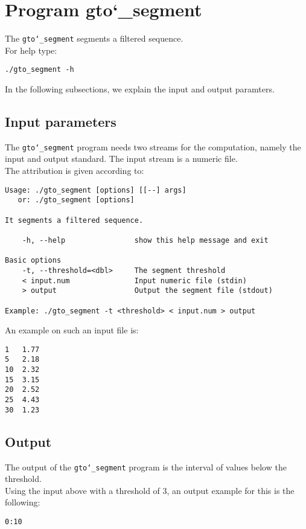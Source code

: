\section{Program gto\char`_segment}
The \texttt{gto\char`_segment} segments a filtered sequence.\\
For help type:
\begin{lstlisting}
./gto_segment -h
\end{lstlisting}
In the following subsections, we explain the input and output paramters.

\subsection*{Input parameters}

The \texttt{gto\char`_segment} program needs two streams for the computation, namely the input and output standard. The input stream is a numeric file.\\
The attribution is given according to:
\begin{lstlisting}
Usage: ./gto_segment [options] [[--] args]
   or: ./gto_segment [options]

It segments a filtered sequence.

    -h, --help                show this help message and exit

Basic options
    -t, --threshold=<dbl>     The segment threshold
    < input.num               Input numeric file (stdin)
    > output                  Output the segment file (stdout)

Example: ./gto_segment -t <threshold> < input.num > output
\end{lstlisting}
An example on such an input file is:
\begin{lstlisting}
1   1.77
5   2.18
10  2.32
15  3.15
20  2.52
25  4.43
30  1.23
\end{lstlisting}

\subsection*{Output}
The output of the \texttt{gto\char`_segment} program is the interval of values ​​below the threshold.\\
Using the input above with a threshold of 3, an output example for this is the following:
\begin{lstlisting}
0:10
\end{lstlisting}